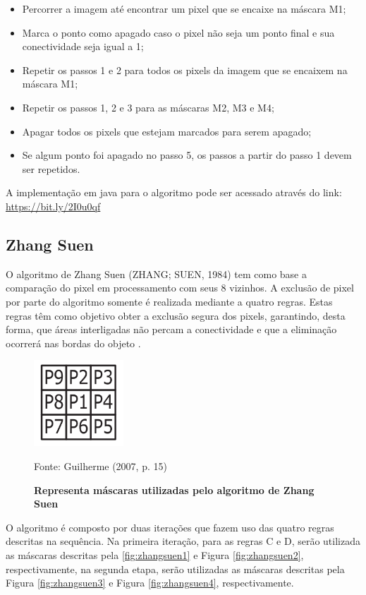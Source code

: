 \documentclass[
	12pt,				%
	oneside,			%
	a4paper,			%
	english,			%
	french,				%
	spanish,			%
	brazil,				%
	]{abntex2}
\begin{document}
\begin{itemize}
\item Percorrer a imagem até encontrar um pixel que se encaixe na máscara M1;
\item Marca o ponto como apagado caso o pixel não seja um ponto final e sua conectividade seja igual a 1;
\item Repetir os passos 1 e 2 para todos os pixels da imagem que se encaixem na máscara M1;
\item Repetir os passos 1, 2 e 3 para as máscaras M2, M3 e M4;
\item Apagar todos os pixels que estejam marcados para serem apagado;
\item Se algum ponto foi apagado no passo 5, os passos a partir do passo 1 devem ser repetidos.
\end{itemize}

A implementação em java para o algoritmo pode ser acessado através do link: \url{https://bit.ly/2I0u0qf}

\subsection{Zhang Suen}

O algoritmo de Zhang Suen (ZHANG; SUEN, 1984) tem como base a comparação do pixel em processamento com seus 8 vizinhos. A exclusão de pixel por parte do algoritmo somente é realizada mediante a quatro regras. Estas regras têm como objetivo obter a exclusão segura dos pixels, garantindo, desta forma, que áreas interligadas não percam a conectividade e que a eliminação ocorrerá nas bordas do objeto \cite{guilherme:2007}.

\begin{figure}[ht]
\centering
\caption{\textbf{Representa máscaras utilizadas pelo algoritmo de Zhang Suen}}
\includegraphics[width=0.3\textwidth]{imagens/zhangsuen_mascara.png}

Fonte: Guilherme (2007, p. 15)
\label{fig:zhangsuen_mascara}
\end{figure}

O algoritmo é composto por duas iterações que fazem uso das quatro regras descritas na sequência. Na primeira iteração, para as regras C e D, serão utilizada as máscaras descritas pela \ref{fig:zhangsuen1} e Figura \ref{fig:zhangsuen2}, respectivamente, na segunda etapa, serão utilizadas as máscaras descritas pela Figura \ref{fig:zhangsuen3} e Figura \ref{fig:zhangsuen4}, respectivamente.
\end{document}
